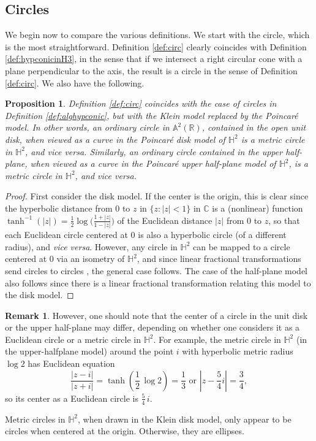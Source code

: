 \documentclass[12pt]{amsart}
\newtheorem{proposition}[theorem]{Proposition}
\theoremstyle{definition}
\newtheorem{remark}[theorem]{Remark}
\begin{document}
\subsection{Circles}
\label{sec:circle}

We begin now to compare the various definitions.  We start with the
circle, which is the most straightforward.  Definition \ref{def:circ}
clearly coincides with Definition \ref{def:hypconicinH3}, in the sense
that if we intersect a right circular cone with a plane perpendicular
to the axis, the result is a circle in the sense of
Definition \ref{def:circ}. We also have the following.
\begin{proposition}
\label{prop:twocircles}
Definition \ref{def:circ} coincides with the case of circles
in Definition \ref{def:alghypconic}, but with the Klein model replaced
by the Poincar\'e model.  In other words, an ordinary
circle in ${\mathbb A}^2({\mathbb R})$, contained in the open unit disk, 
when viewed as a curve in the Poincar\'e disk model of ${\mathbb H}^2$
is a metric circle in ${\mathbb H}^2$, and \emph{vice versa}. Similarly, an
ordinary circle contained in the upper half-plane, when viewed as a
curve in the Poincar\'e upper half-plane model of ${\mathbb H}^2$, 
is a metric circle in ${\mathbb H}^2$, and \emph{vice versa}.
\end{proposition}
\begin{proof}
First consider the disk model.  
If the center is the origin, this is clear since the hyperbolic
distance from $0$ to $z$ in $\{z: |z|<1\}$ 
in ${\mathbb C}$ is a (nonlinear) function $\tanh^{-1}(|z|)=
\frac{1}{2}\log\bigl(\frac{1+|z|}{1-|z|}\bigr)$ of the Euclidean distance
$|z|$ from $0$ to $z$, so that each Euclidean circle centered at $0$ is
also a hyperbolic circle (of a different radius), and \emph{vice
versa}.  However, any circle in ${\mathbb H}^2$ can be mapped to a
circle centered at $0$ via an isometry of ${\mathbb H}^2$, and since linear
fractional transformations send circles to circles
\cite[Ch.\ 3, \S3.2, Theorem 14]{MR510197}, the general case
follows. The case of the half-plane model also follows since there is a linear
fractional transformation relating this model to the disk model.
\end{proof}
\begin{remark}
\label{rem:circcenter}
However, one should note that the center of a circle in the unit disk
or the upper half-plane may differ, depending on whether one considers
it as a Euclidean circle or a metric circle in ${\mathbb H}^2$.  For example,
the metric circle in ${\mathbb H}^2$ (in the upper-halfplane model) around the
point $i$ with hyperbolic metric radius $\log 2$ has Euclidean equation 
\[
\frac{\vert z - i\vert}{\vert z + i\vert} = \tanh\left(\frac12 \,\log 2\right)
= \frac{1}{3} \text{ or }
\left\vert z - \frac{5}{4}i\right\vert = \frac{3}{4},
\]
so its center as a Euclidean circle is $\frac{5}{4}\, i$.

Metric circles in ${\mathbb H}^2$, when drawn in the Klein disk model, 
only appear to be circles when centered at the origin. Otherwise, they
are ellipses.
\end{remark}
\end{document}
